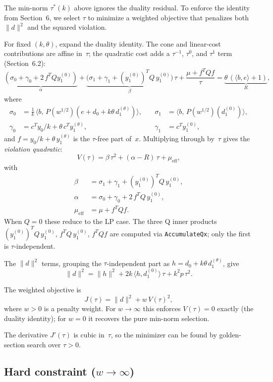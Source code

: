 \documentclass{article}
\newcommand{\PW}{P(w^{1/2})}
\begin{document}
The min-norm $\tau^*(k)$ above ignores the duality residual.  To
enforce the identity from Section~6, we select $\tau$ to minimize a
weighted objective that penalizes both $\|d\|^2$ and the squared
violation.

For fixed $(k,\theta)$, expand the duality identity.  The cone and
linear-cost contributions are affine in~$\tau$; the quadratic cost adds
a $\tau^{-1}$, $\tau^0$, and $\tau^1$ term (Section~6.2):
\[
  \underbrace{(\sigma_0 + \gamma_0 + 2\,f^T Q y_1^{(0)})}_{\alpha}
  + \underbrace{\bigl(\sigma_1 + \gamma_1
    + (y_1^{(0)})^T Q\,y_1^{(0)}\bigr)}_\beta \,\tau
  + \frac{\mu + f^T Q f}{\tau}
  = \underbrace{\theta\,(\langle b,e\rangle + 1)}_{R},
\]
where
\begin{align*}
  \sigma_0 &= \tfrac{1}{k}\,\langle b,\, \PW(e + d_0 + k\theta\,d_1^{(\theta)})\rangle,
  &\quad \sigma_1 &= \langle b,\, \PW(d_1^{(0)})\rangle, \\
  \gamma_0 &= c^T y_0 / k + \theta\,c^T y_1^{(\theta)},
  &\quad \gamma_1 &= c^T y_1^{(0)},
\end{align*}
and $f = y_0/k + \theta\,y_1^{(\theta)}$ is the $\tau$-free part of~$x$.
Multiplying through by~$\tau$ gives the \emph{violation quadratic}:
\[
  V(\tau) = \beta\,\tau^2 + (\alpha - R)\,\tau + \mu_{\mathrm{eff}},
\]
with
\begin{align*}
  \beta &= \sigma_1 + \gamma_1 + (y_1^{(0)})^T Q\,y_1^{(0)}, \\
  \alpha &= \sigma_0 + \gamma_0 + 2\,f^T Q\,y_1^{(0)}, \\
  \mu_{\mathrm{eff}} &= \mu + f^T Q f.
\end{align*}
When $Q = 0$ these reduce to the LP case.  The three Q inner products
$(y_1^{(0)})^T Q\,y_1^{(0)}$, $f^T Q\,y_1^{(0)}$, $f^T Q f$ are
computed via \texttt{AccumulateQx}; only the first is
$\tau$-independent.

The $\|d\|^2$ terms, grouping the $\tau$-independent part as
$h = d_0 + k\theta\,d_1^{(\theta)}$, give
\[
  \|d\|^2 = \|h\|^2 + 2k\,\langle h, d_1^{(0)}\rangle\,\tau
            + k^2 p\,\tau^2.
\]

The weighted objective is
\[
  \boxed{J(\tau) = \|d\|^2 + w\,V(\tau)^2,}
\]
where $w > 0$ is a penalty weight.  For $w \to \infty$ this enforces
$V(\tau) = 0$ exactly (the duality identity); for $w = 0$ it recovers
the pure min-norm selection.

The derivative $J'(\tau)$ is cubic in~$\tau$, so the minimizer can be
found by golden-section search over $\tau > 0$.

\subsection{Hard constraint ($w \to \infty$)}
\end{document}
